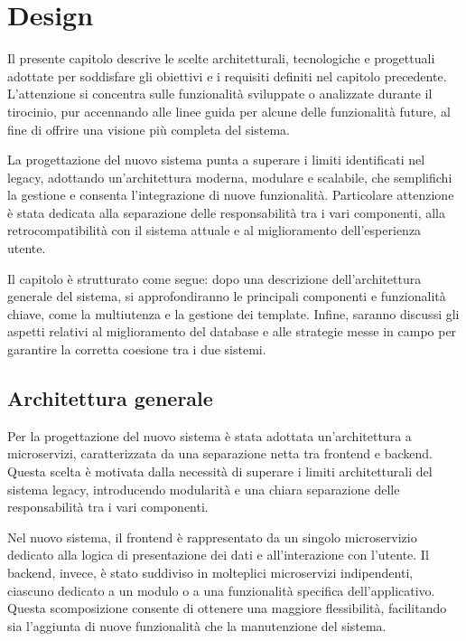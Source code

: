 \chapter{Design}

Il presente capitolo descrive le scelte architetturali, tecnologiche e progettuali adottate per soddisfare gli obiettivi e i requisiti definiti nel capitolo precedente. L'attenzione si concentra sulle funzionalità sviluppate o analizzate durante il tirocinio, pur accennando alle linee guida per alcune delle funzionalità future, al fine di offrire una visione più completa del sistema.

La progettazione del nuovo sistema punta a superare i limiti identificati nel legacy, adottando un'architettura moderna, modulare e scalabile, che semplifichi la gestione e consenta l'integrazione di nuove funzionalità. Particolare attenzione è stata dedicata alla separazione delle responsabilità tra i vari componenti, alla retrocompatibilità con il sistema attuale e al miglioramento dell'esperienza utente.

Il capitolo è strutturato come segue: dopo una descrizione dell’architettura generale del sistema, si approfondiranno le principali componenti e funzionalità chiave, come la multiutenza e la gestione dei template. Infine, saranno discussi gli aspetti relativi al miglioramento del database e alle strategie messe in campo per garantire la corretta coesione tra i due sistemi.

\section{Architettura generale}

Per la progettazione del nuovo sistema è stata adottata un'architettura a microservizi, caratterizzata da una separazione netta tra frontend e backend. Questa scelta è motivata dalla necessità di superare i limiti architetturali del sistema legacy, introducendo modularità e una chiara separazione delle responsabilità tra i vari componenti.

Nel nuovo sistema, il frontend è rappresentato da un singolo microservizio dedicato alla logica di presentazione dei dati e all'interazione con l'utente. Il backend, invece, è stato suddiviso in molteplici microservizi indipendenti, ciascuno dedicato a un modulo o a una funzionalità specifica dell'applicativo. Questa scomposizione consente di ottenere una maggiore flessibilità, facilitando sia l'aggiunta di nuove funzionalità che la manutenzione del sistema.

